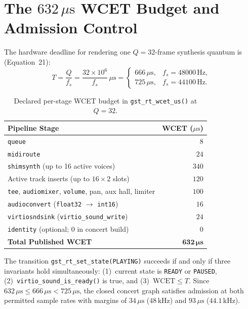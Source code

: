 \section{The $632\,\mu\text{s}$ WCET Budget and Admission Control}

The hardware deadline for rendering one $Q = 32$-frame synthesis quantum is (Equation~21):
\begin{equation}
\label{eq:block-period}
T = \frac{Q}{f_s} = \frac{32 \times 10^6}{f_s}\,\mu\text{s}
  = \begin{cases} 666\,\mu\text{s}, & f_s = 48000\,\text{Hz}, \\ 725\,\mu\text{s}, & f_s = 44100\,\text{Hz}. \end{cases}
\end{equation}

\begin{table}[htbp]
\centering
\caption{Declared per-stage WCET budget in \texttt{gst\_rt\_wcet\_us()} at $Q = 32$.}
\begin{tabular}{@{}lr@{}}
\toprule
Pipeline Stage & WCET ($\mu\text{s}$) \\
\midrule
\texttt{queue} & $8$ \\
\texttt{midiroute} & $24$ \\
\texttt{shimsynth} (up to 16 active voices) & $340$ \\
Active track inserts (up to $16 \times 2$ slots) & $120$ \\
\texttt{tee}, \texttt{audiomixer}, \texttt{volume}, pan, aux hall, limiter & $100$ \\
\texttt{audioconvert} (\texttt{float32} $\to$ \texttt{int16}) & $16$ \\
\texttt{virtiosndsink} (\texttt{virtio\_sound\_write}) & $24$ \\
\texttt{identity} (optional; $0$ in concert build) & $0$ \\
\midrule
\textbf{Total Published WCET} & $\mathbf{632\,\mu\mathbf{s}}$ \\
\bottomrule
\end{tabular}
\end{table}

\begin{theorem}
The transition \texttt{gst\_rt\_set\_state(PLAYING)} succeeds if and only if three invariants hold simultaneously: (1)~current state is \texttt{READY} or \texttt{PAUSED}, (2)~\texttt{virtio\_sound\_is\_ready()} is true, and (3)~$\mathrm{WCET} \le T$. Since $632\,\mu\text{s} \le 666\,\mu\text{s} < 725\,\mu\text{s}$, the closed concert graph satisfies admission at both permitted sample rates with margins of $34\,\mu\text{s}$ ($48\,\text{kHz}$) and $93\,\mu\text{s}$ ($44.1\,\text{kHz}$).
\end{theorem}

